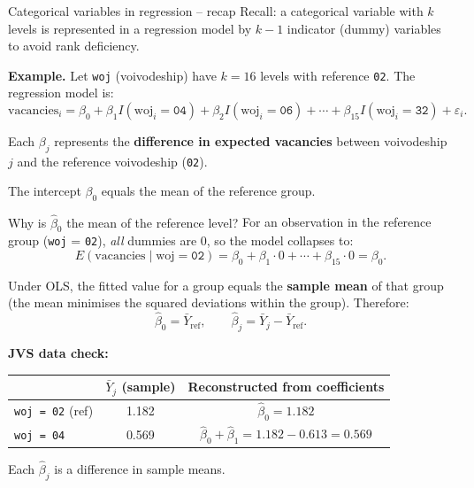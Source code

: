 \documentclass[10pt,ignorenonframetext,aspectratio=169]{beamer}
\begin{document}
\begin{frame}{Categorical variables in regression -- recap}
Recall: a categorical variable with $k$ levels is represented in a regression
model by $k-1$ indicator (dummy) variables to avoid rank deficiency.

\medskip
\textbf{Example.} Let \texttt{woj} (voivodeship) have $k=16$ levels with
reference \texttt{02}. The regression model is:
\begin{equation}
    \text{vacancies}_i = \beta_0 + \beta_1 I(\text{woj}_i\!=\!\texttt{04})
    + \beta_2 I(\text{woj}_i\!=\!\texttt{06}) + \cdots
    + \beta_{15} I(\text{woj}_i\!=\!\texttt{32}) + \varepsilon_i.
\end{equation}

Each $\beta_j$ represents the \textbf{difference in expected vacancies} between
voivodeship $j$ and the reference voivodeship (\texttt{02}).

\medskip
The intercept $\beta_0$ equals the mean of the reference group.
\end{frame}


\begin{frame}{Why is $\hat{\beta}_0$ the mean of the reference level?}
For an observation in the reference group (\texttt{woj} = \texttt{02}), \emph{all} dummies are 0, so the model collapses to:
\[
E(\text{vacancies} \mid \text{woj} = \texttt{02}) = \beta_0 + \beta_1 \cdot 0 + \cdots + \beta_{15} \cdot 0 = \beta_0.
\]

\medskip
Under OLS, the fitted value for a group equals the \textbf{sample mean} of that group (the mean minimises the squared deviations within the group). Therefore:
\[
\hat{\beta}_0 = \bar{Y}_{\text{ref}}, \qquad \hat{\beta}_j = \bar{Y}_j - \bar{Y}_{\text{ref}}.
\]

\medskip
\textbf{JVS data check:}
\begin{table}[h]\centering\small
\begin{tabular}{lcc}
\hline
& $\bar{Y}_j$ (sample) & Reconstructed from coefficients \\
\hline
\texttt{woj = 02} (ref) & 1.182 & $\hat{\beta}_0 = 1.182$ \\
\texttt{woj = 04}       & 0.569 & $\hat{\beta}_0 + \hat{\beta}_1 = 1.182 - 0.613 = 0.569$ \\
\hline
\end{tabular}
\end{table}

\medskip
\alert{Each $\hat{\beta}_j$ is a difference in sample means.}
\end{frame}
\end{document}
